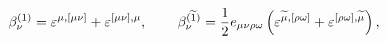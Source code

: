 \begin{equation}
\beta _\nu ^{(1)}=\varepsilon ^{\mu ,[\mu \nu ]}+\varepsilon
^{[\mu \nu ],\mu } ,\hspace{0.3in}\beta _\nu
^{(\widetilde{1})}=\frac 12e_{\mu \nu \rho \omega }\left(
\varepsilon ^{\widetilde{\mu },[\rho \omega ]}+\varepsilon ^{[\rho
\omega ],\widetilde{\mu }}\right) , \label{21}
\end{equation}


